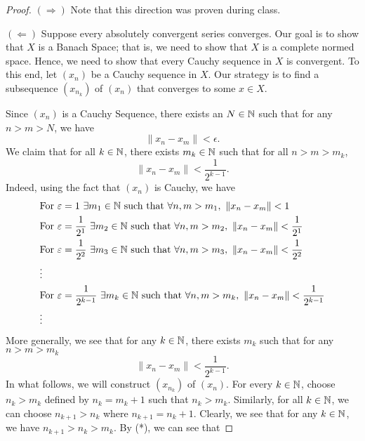\documentclass[a4paper]{article}
\begin{document}
\begin{proof}
\( (\Longrightarrow) \) Note that this direction was proven during class.

\( (\Longleftarrow) \) Suppose every absolutely convergent series converges. Our goal is to show that \( X  \) is a Banach Space; that is, we need to show that \( X  \) is a complete normed space. Hence, we need to show that every Cauchy sequence in \( X  \) is convergent. To this end, let \( ({x}_{n}) \) be a Cauchy sequence in \( X  \). Our strategy is to find a subsequence \( ({x}_{{n}_{k }}) \) of \( ({x}_{n}) \) that converges to some \( x \in X  \).

Since \( ({x}_{n}) \) is a Cauchy Sequence, there exists an \( N \in \mathbb{N}  \) such that for any \( n > m > N  \), we have
\[  \|{x}_{n} - {x}_{m} \| < \epsilon.  \]
We claim that for all \( k \in \mathbb{N}  \), there exists \( {m}_{k} \in \mathbb{N}  \) such that for all \( n > m  > {m}_{k} \),  
\[  \|{x}_{n} - {x}_{m}\| < \frac{ 1 }{ 2^{k-1} }. \]
Indeed, using the fact that \( ({x}_{n}) \) is Cauchy, we have
\begin{align*}
    &\text{For} \ \epsilon = 1  \ \exists {m}_{1} \in \N \ \text{such that} \ \forall n,m > {m}_{1}, \ \|{x}_{n} - {x}_{m} \| < 1    \\
    &\text{For} \ \epsilon = \frac{ 1 }{ 2^{1} }  \ \exists {m}_{2} \in \N \ \text{such that} \ \forall n,m > {m}_{2}, \ \|{x}_{n} - {x}_{m} \| < \frac{ 1 }{ 2^{1} }    \\
    &\text{For} \ \epsilon = \frac{ 1 }{ 2^{2} }  \ \exists {m}_{3} \in \N \ \text{such that} \ \forall n,m > {m}_{3}, \ \|{x}_{n} - {x}_{m} \| < \frac{ 1 }{ 2^{2} }    \\
                                               &\vdots \\
                                               &\text{For} \ \epsilon = \frac{ 1 }{ 2^{k-1} }  \ \exists {m}_{k} \in \N \ \text{such that} \ \forall n,m > {m}_{k}, \ \|{x}_{n} - {x}_{m} \| < \frac{ 1 }{ 2^{k-1} } \\
                                                     &\vdots
\end{align*}
More generally, we see that for any \( k \in \mathbb{N}  \), there exists \( {m}_{k} \) such that for any \( n > m > {m}_{k} \)
\[  \|{x}_{n} - {x}_{m} \| < \frac{ 1 }{ 2^{k-1} }. \tag{*}  \]
In what follows, we will construct \( ({x}_{{n}_{k}}) \) of \( ({x}_{n}) \). For every \( k \in \mathbb{N}  \), choose \( {n}_{k} > {m}_{k} \) defined by \( {n}_{k} = {m}_{k} + 1     \) such that \( {n}_{k} > {m}_{k} \). Similarly, for all \( k \in \mathbb{N} \), we can choose \( {n}_{k+1} > {n}_{k}   \) where \( {n}_{k+1} = {n}_{k} + 1  \).  Clearly, we see that for any \( k \in \mathbb{N}  \), we have \( {n}_{k+1} > {n}_{k} > {m}_{k} \). By (*), we can see that        

\end{proof}
\end{document}
